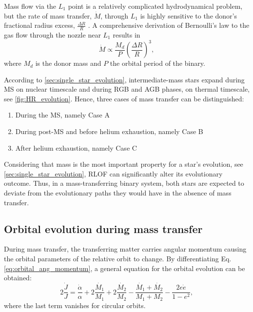 Mass flow via the $L_1$ point is a relatively complicated hydrodynamical problem, but the rate of mass transfer, $\dot{M}$, through $L_1$ is highly sensitive to the donor's fractional radius excess, $\frac{\Delta R}{R}$ . A comprehensive derivation of Bernoulli's law to the gas flow through the nozzle near $L_1$ results in 
\begin{equation}\label{eq:mass_loss_rate_anal}
    \dot{M} \propto \frac{M_{d}}{P} \left( \frac{\Delta R}{R}\right)^3,
\end{equation}
where $M_{d}$ is the donor mass and $P$ the orbital period of the binary.

According to \cref{sec:single_star_evolution}, intermediate-mass stars expand during MS on nuclear timescale and during RGB and AGB phases, on thermal timescale, see \cref{fig:HR_evolution}.  Hence, three cases of mass transfer can be distinguished:
\begin{enumerate}
    \item During the MS, namely Case A
    \item During post-MS and before helium exhaustion, namely Case B
    \item After helium exhaustion, namely Case C
\end{enumerate}
Considering that mass is the most important property for a star's evolution, see \cref{sec:single_star_evolution}, RLOF can significantly alter its evolutionary outcome. Thus, in a mass-transferring binary system, both stars are expected to deviate from the evolutionary paths they would have in the absence of mass transfer. 

\subsection{Orbital evolution during mass transfer}\label{sub:orbit_evol_mass_loss}

During mass transfer, the transferring matter carries angular momentum causing the orbital parameters of the relative orbit to change. By differentiating Eq. \eqref{eq:orbital_ang_momentum}, a general equation for the orbital evolution can be obtained:
\begin{equation}\label{eq:orb_ang_momen_derivative}
    2\frac{\dot{J}}{J} = \frac{\dot{\alpha}}{\alpha} + 2 \frac{\dot{M_1}}{M_1} + 2 \frac{\dot{M_2}}{M_2} - \frac{ \dot{M_1} + \dot{M_2}}{M_1 + M_2} - \frac{2e \dot{e}}{1-e^2},
\end{equation}
where the last term vanishes for circular orbits.

